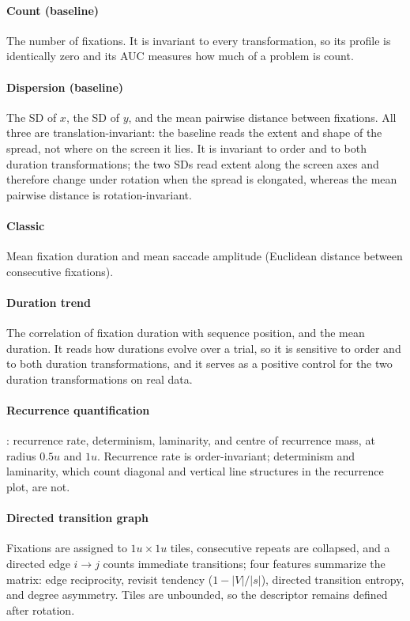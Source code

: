 \documentclass[man,floatsintext,12pt]{apa7}
\begin{document}
\paragraph{Count (baseline)} The number of fixations. It is invariant to every transformation, so its profile is identically zero and its AUC measures how much of a problem is count.

\paragraph{Dispersion (baseline)} The SD of $x$, the SD of $y$, and the mean pairwise distance between fixations. All three are translation-invariant: the baseline reads the extent and shape of the spread, not where on the screen it lies. It is invariant to order and to both duration transformations; the two SDs read extent along the screen axes and therefore change under rotation when the spread is elongated, whereas the mean pairwise distance is rotation-invariant.

\paragraph{Classic} Mean fixation duration and mean saccade amplitude (Euclidean distance between consecutive fixations).

\paragraph{Duration trend} The correlation of fixation duration with sequence position, and the mean duration. It reads how durations evolve over a trial, so it is sensitive to order and to both duration transformations, and it serves as a positive control for the two duration transformations on real data.

\paragraph{Recurrence quantification} \citep{anderson2013recurrence}: recurrence rate, determinism, laminarity, and centre of recurrence mass, at radius $0.5u$ and $1u$. Recurrence rate is order-invariant; determinism and laminarity, which count diagonal and vertical line structures in the recurrence plot, are not.

\paragraph{Directed transition graph} Fixations are assigned to $1u\times1u$ tiles, consecutive repeats are collapsed, and a directed edge $i\to j$ counts immediate transitions; four features summarize the matrix: edge reciprocity, revisit tendency ($1 - |V|/|s|$), directed transition entropy, and degree asymmetry. Tiles are unbounded, so the descriptor remains defined after rotation.
\end{document}
